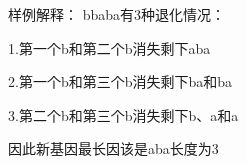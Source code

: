 样例解释：
bbaba有3种退化情况：

1.第一个b和第二个b消失剩下aba

2.第一个b和第三个b消失剩下ba和ba

3.第二个b和第三个b消失剩下b、a和a

因此新基因最长因该是aba长度为3
